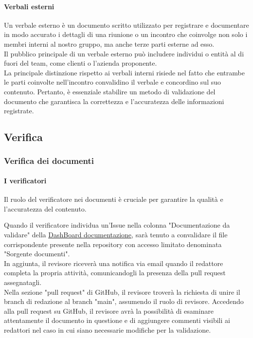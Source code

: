 \documentclass{article}
\begin{document}
\paragraph{Verbali esterni}\label{sec:verbali esterni}

Un verbale esterno è un documento scritto utilizzato per registrare e documentare in modo accurato i dettagli di una riunione o un incontro che coinvolge non solo i membri interni al nostro gruppo, ma anche terze parti esterne ad esso.\\
Il pubblico principale di un verbale esterno può includere individui o entità al di fuori del team, come clienti o l'azienda proponente.\\
La principale distinzione rispetto ai verbali interni risiede nel fatto che entrambe le parti coinvolte nell'incontro convalidino il verbale e concordino sul suo contenuto. Pertanto, è essenziale stabilire un metodo di validazione del documento che garantisca la correttezza e l'accuratezza delle informazioni registrate.\\

\subsection{Verifica}
\subsubsection{Verifica dei documenti}
\paragraph{I verificatori}\label{sec:verificatori}

    Il ruolo del verificatore nei documenti è cruciale per garantire la qualità e l'accuratezza del contenuto.

Quando il verificatore individua un'Issue nella colonna "Documentazione da validare" della  \href{https://github.com/orgs/ByteOps-swe/projects/1/views/1}{DashBoard documentazione}, sarà tenuto a convalidare il file corrispondente presente nella repository con accesso limitato denominata "Sorgente documenti". \\
In aggiunta, il revisore riceverà una notifica via email quando il redattore completa la propria attività, comunicandogli la presenza della pull request assegnatagli.\\
Nella sezione "pull request" di GitHub, il revisore troverà la richiesta di unire il branch di redazione al branch "main", assumendo il ruolo di revisore. Accedendo alla pull request su GitHub, il revisore avrà la possibilità di esaminare attentamente il documento in questione e di aggiungere commenti visibili ai redattori nel caso in cui siano necessarie modifiche per la validazione.
\end{document}
